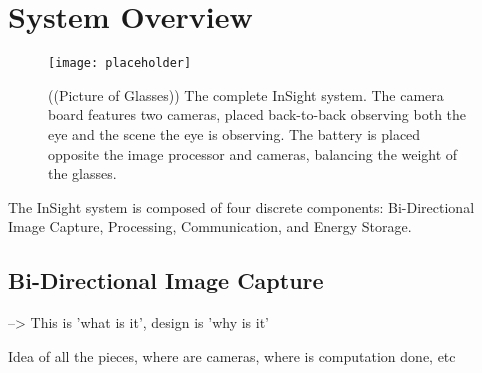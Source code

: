 \section{System Overview}
\label{sec:overview}

\begin{figure}
\texttt{[image: placeholder]}
\caption{((Picture of Glasses)) The complete InSight system. The camera board
features two cameras, placed back-to-back observing both the eye and the scene
the eye is observing. The battery is placed opposite the image processor and
cameras, balancing the weight of the glasses.}
\label{fig:glasses}
\end{figure}

The InSight system is composed of four discrete components: Bi-Directional
Image Capture, Processing, Communication, and Energy Storage.

\subsection{Bi-Directional Image Capture}


--> This is 'what is it', design is 'why is it'

Idea of all the pieces,
where are cameras, where is computation done, etc
